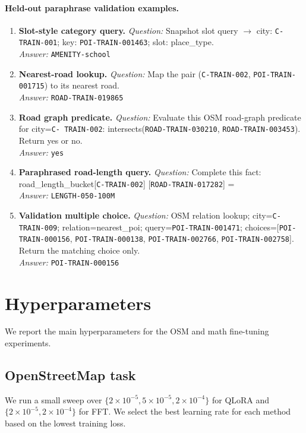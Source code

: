 \documentclass[11pt]{article}
\begin{document}
\paragraph{Held-out paraphrase validation examples.}
\begin{enumerate}
    \item \textbf{Slot-style category query.}
    \textit{Question:} Snapshot slot query $\rightarrow$ city: \texttt{C-TRAIN-001};
key: \texttt{POI-TRAIN-001463}; slot: place\_type. \\
    \textit{Answer:} \texttt{AMENITY-school}

    \item \textbf{Nearest-road lookup.}
    \textit{Question:} Map the pair (\texttt{C-TRAIN-002}, \texttt{POI-TRAIN-001715})
to its nearest road. \\
    \textit{Answer:} \texttt{ROAD-TRAIN-019865}

    \item \textbf{Road graph predicate.}
    \textit{Question:} Evaluate this OSM road-graph predicate for city=\texttt{C-
TRAIN-002}: intersects(\texttt{ROAD-TRAIN-030210}, \texttt{ROAD-TRAIN-003453}). Return
yes or no. \\
    \textit{Answer:} \texttt{yes}

    \item \textbf{Paraphrased road-length query.}
    \textit{Question:} Complete this fact: road\_length\_bucket[\texttt{C-TRAIN-002}]
[\texttt{ROAD-TRAIN-017282}] = \\
    \textit{Answer:} \texttt{LENGTH-050-100M}

    \item \textbf{Validation multiple choice.}
    \textit{Question:} OSM relation lookup; city=\texttt{C-TRAIN-009};
relation=nearest\_poi; query=\texttt{POI-TRAIN-001471}; 
choices=[\texttt{POI-TRAIN-000156}, 
\texttt{POI-TRAIN-000138},
\texttt{POI-TRAIN-002766}, \texttt{POI-TRAIN-002758}]. 
Return the matching choice only. \\
    \textit{Answer:} \texttt{POI-TRAIN-000156}
\end{enumerate}


\section{Hyperparameters}
\label{app:hyperparameters}

We report the main hyperparameters for the OSM and math fine-tuning experiments.

\subsection{OpenStreetMap task}
\label{app:hyperparam-osm}
We run a small sweep over $\{2\times10^{-5}, 5\times10^{-5}, 2\times10^{-4}\}$
for QLoRA and $\{2\times10^{-5}, 2\times10^{-4}\}$ for FFT. We select the best
learning rate for each method based on the lowest training loss.
\end{document}
